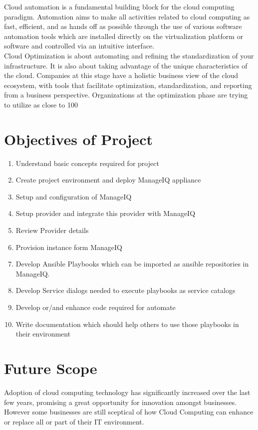 \documentclass[a4paper,12pt]{report}
\begin{document}
Cloud automation is a fundamental building block for the cloud computing paradigm. Automation aims to make all activities related to cloud computing as fast, efficient, and as hands off as possible through the use of various software automation tools which are installed directly on the virtualization platform or software and controlled via an intuitive interface.\\

Cloud Optimization is about automating and refining the standardization of your infrastructure. It is also about taking advantage of the unique characteristics of the cloud. Companies at this stage have a holistic business view of the cloud ecosystem, with tools that facilitate optimization, standardization, and reporting from a business perspective. Organizations at the optimization phase are trying to utilize as close to 100%


\chapter{Objectives of Project}
\begin{enumerate}
	\item Understand basic concepts required for project
	\item Create project environment and deploy ManageIQ appliance
	\item Setup and configuration of ManageIQ 
	\item Setup provider and integrate 	this provider with ManageIQ
	\item Review Provider details 
	\item Provision instance form ManageIQ
	\item Develop Ansible Playbooks which can be imported as ansible repositories in ManageIQ.
	\item Develop Service dialogs needed to execute playbooks as service catalogs
	\item Develop or/and enhance code required for automate
	\item Write documentation which should help others to use those playbooks in their environment
\end{enumerate}

\chapter{Future Scope}
Adoption of cloud computing technology has significantly increased over the last few years, promising a great opportunity for innovation amongst businesses. However some businesses are still sceptical of how Cloud Computing can enhance or replace all or part of their IT environment.\\
\end{document}
